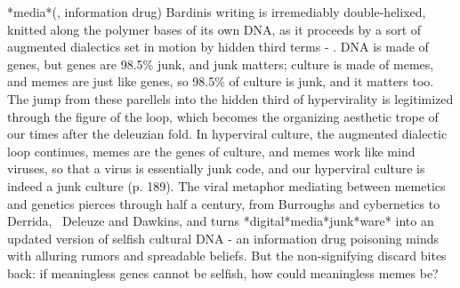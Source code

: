*media*\newline
[4FE1?][606F?][6BD2?][54C1?] (,
information drug)\newline
Bardini{\textquotesingle}s writing is irremediably double-helixed,
knitted along the polymer bases of its own DNA, as it proceeds by a
sort of augmented dialectics set in motion by hidden third terms -
. DNA is made of genes, but genes are 98.5\%
junk, and junk matters; culture is made of memes, and memes are just
like genes, so 98.5\% of culture is junk, and it matters too. The jump
from these parellels into the hidden third of hypervirality is
legitimized through the figure of the loop, which becomes the
organizing aesthetic trope of our times after the deleuzian fold. In
hyperviral culture, the augmented dialectic loop continues, memes are
the genes of culture, and memes work like mind viruses, so that
{\textquotedbl}a virus is essentially junk code, and our hyperviral
culture is indeed a junk culture{\textquotedbl} (p. 189). The viral
metaphor mediating between memetics and genetics pierces through half a
century, from Burroughs and cybernetics to Derrida,~ Deleuze and
Dawkins, and turns *digital*media*junk*ware* into an updated version of
selfish cultural DNA - an information drug poisoning minds with
alluring rumors and spreadable beliefs. But the non-signifying discard
bites back: if meaningless genes cannot be selfish, how could
meaningless memes be?

